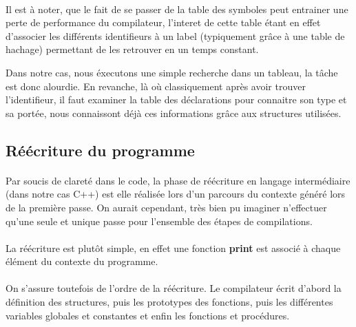 \paragraph{}Il est à noter, que le fait de se passer de la table des symboles 
peut entrainer une perte de performance du compilateur, l'interet de cette 
table étant en effet d'associer les différents identifieurs à un label 
(typiquement grâce à une table de hachage) permettant de les 
retrouver en un temps constant.

Dans notre cas, nous éxecutons une simple recherche dans un tableau,
la tâche est donc alourdie. En revanche, là où classiquement après avoir 
trouver l'identifieur, il faut examiner la table des déclarations pour 
connaitre son type et sa portée, nous connaissont déjà ces informations grâce 
aux structures utilisées.

\subsection{Réécriture du programme}

\paragraph{}Par soucis de clareté dans le code, la phase de réécriture en 
langage intermédiaire (dans notre cas C++) est elle réalisée lors d'un parcours 
du contexte généré lors de la première passe. On aurait cependant, très bien
pu imaginer n'effectuer qu'une seule et unique passe pour l'ensemble des 
étapes de compilations.

\paragraph{}La réécriture est plutôt simple, en effet une fonction 
\textbf{print} est associé à chaque élément du contexte du programme. 

\paragraph{}On s'assure toutefois de l'ordre de la réécriture. Le compilateur
écrit d'abord la définition des structures, puis les prototypes des fonctions,
puis les différentes variables globales et constantes et enfin les fonctions et 
procédures.
